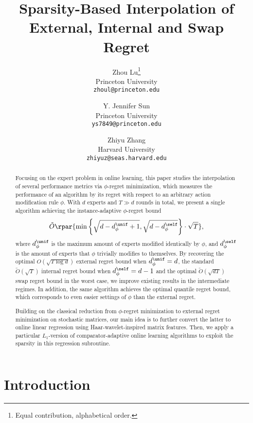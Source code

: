 \documentclass[10pt]{article}
\title{\textbf{Sparsity-Based Interpolation of External, Internal and Swap Regret}}
\author{
Zhou Lu\thanks{Equal contribution, alphabetical order.}\\
Princeton University\\
\texttt{zhoul@princeton.edu}\\
\and
Y. Jennifer Sun\footnotemark[1]\\
Princeton University\\
\texttt{ys7849@princeton.edu}\\
\and
Zhiyu Zhang\footnotemark[1]\\
Harvard University\\
\texttt{zhiyuz@seas.harvard.edu}\\
}
\date{\vspace{-5ex}}
\begin{document}
\maketitle

\begin{abstract}
Focusing on the expert problem in online learning, this paper studies the interpolation of several performance metrics via $\phi$-regret minimization, which measures the performance of an algorithm by its regret with respect to an arbitrary action modification rule $\phi$. With $d$ experts and $T\gg d$ rounds in total, we present a single algorithm achieving the instance-adaptive $\phi$-regret bound
\begin{equation*}
\tilde O\rpar{\min\left\{\sqrt{d-d^\unif_\phi+1},\sqrt{d-d^\self_\phi}\right\}\cdot\sqrt{T}},
\end{equation*}
where $d^\unif_\phi$ is the maximum amount of experts modified identically by $\phi$, and $d^\self_\phi$ is the amount of experts that $\phi$ trivially modifies to themselves. By recovering the optimal $O(\sqrt{T\log d})$ external regret bound when $d^\unif_\phi=d$, the standard $\tilde O(\sqrt{T})$ internal regret bound when $d^\self_\phi=d-1$ and the optimal $\tilde O(\sqrt{dT})$ swap regret bound in the worst case, we improve existing results in the intermediate regimes. In addition, the same algorithm achieves the optimal quantile regret bound, which corresponds to even easier settings of $\phi$ than the external regret. 

Building on the classical reduction from $\phi$-regret minimization to external regret minimization on stochastic matrices, our main idea is to further convert the latter to online linear regression using Haar-wavelet-inspired matrix features. Then, we apply a particular $L_1$-version of comparator-adaptive online learning algorithms to exploit the sparsity in this regression subroutine. 
\end{abstract}

\section{Introduction}
\end{document}
